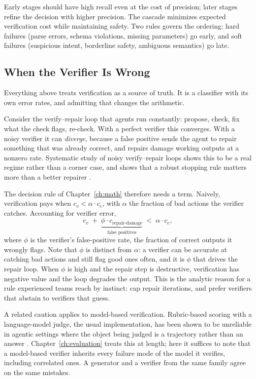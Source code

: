 \documentclass[11pt]{book}
\begin{document}
Early stages should have high recall even at the cost of precision; later stages refine the decision with higher precision. The cascade minimizes expected verification cost while maintaining safety. Two rules govern the ordering: hard failures (parse errors, schema violations, missing parameters) go early, and soft failures (suspicious intent, borderline safety, ambiguous semantics) go late.

\subsection{When the Verifier Is Wrong}

Everything above treats verification as a source of truth. It is a classifier with its own error rates, and admitting that changes the arithmetic.

Consider the verify--repair loop that agents run constantly: propose, check, fix what the check flags, re-check. With a perfect verifier this converges. With a noisy verifier it can \textit{diverge}, because a false positive sends the agent to repair something that was already correct, and repairs damage working outputs at a nonzero rate. Systematic study of noisy verify--repair loops shows this to be a real regime rather than a corner case, and shows that a robust stopping rule matters more than a better repairer \cite{verifyrepair2026}.

The decision rule of Chapter~\ref{ch:math} therefore needs a term. Naively, verification pays when $c_v < \alpha \cdot c_e$, with $\alpha$ the fraction of bad actions the verifier catches. Accounting for verifier error,
\[
c_v \;+\; \underbrace{\phi \cdot c_{\text{repair-damage}}}_{\text{false positives}} \;<\; \alpha \cdot c_e,
\]
where $\phi$ is the verifier's false-positive rate, the fraction of correct outputs it wrongly flags. Note that $\phi$ is distinct from $\alpha$: a verifier can be accurate at catching bad actions and still flag good ones often, and it is $\phi$ that drives the repair loop. When $\phi$ is high and the repair step is destructive, verification has negative value and the loop degrades the output. This is the analytic reason for a rule experienced teams reach by instinct: cap repair iterations, and prefer verifiers that abstain to verifiers that guess.

A related caution applies to model-based verification. Rubric-based scoring with a language-model judge, the usual implementation, has been shown to be unreliable in agentic settings where the object being judged is a trajectory rather than an answer \cite{judgerubric2026}. Chapter~\ref{ch:evaluation} treats this at length; here it suffices to note that a model-based verifier inherits every failure mode of the model it verifies, including correlated ones. A generator and a verifier from the same family agree on the same mistakes.
\end{document}
